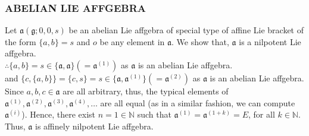 \documentclass{article}
\theoremstyle{definition}
\theoremstyle{remark}
\theoremstyle{plain}
\begin{document}
\subsubsection{ABELIAN LIE  AFFGEBRA}
Let $\mathfrak{a}(\mathfrak{g};0,0,s)$ be an abelian Lie affgebra of special type of affine Lie bracket of the form $\{a,b\}=s$ and $o$ be any element in $\mathfrak{a}$. %
We show that, $\mathfrak{a}$ is a nilpotent Lie affgebra.\\
$\therefore \{a, b\}=s\in \{\mathfrak{a}, \mathfrak{a}\}(=\mathfrak{a}^{(1)})$ as $\mathfrak{a}$ is an abelian Lie affgebra.\\
and $\{c,\{a,b\}\}=\{c,s\}=s\in \{\mathfrak{a}, \mathfrak{a^{(1)}}\}(=\mathfrak{a}^{(2)})$ as $\mathfrak{a}$ is an abelian Lie affgebra. Since $a, b, c \in \mathfrak{a}$ are all arbitrary, thus, the typical elements of $\mathfrak{a}^{(1)}, \mathfrak{a}^{(2)},\mathfrak{a}^{(3)}, \mathfrak{a}^{(4)},\ldots$ are all equal (as in a similar fashion, we can compute $\mathfrak{a}^{(i)}$). Hence, there exist $n=1\in \mathbb{N}$ such that $\mathfrak{a}^{(1)}=\mathfrak{a}^{(1+k)}=E$, for all $k\in \mathbb{N}.$ Thus, $\mathfrak{a}$ is affinely nilpotent Lie affgebra.

    


    
\end{document}

